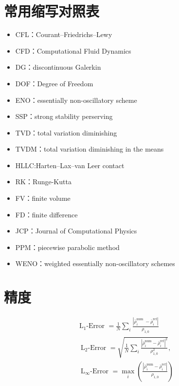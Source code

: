 \documentclass{book}
\begin{document}
\section{常用缩写对照表}
\begin{itemize}
    \item CFL：Courant–Friedrichs–Lewy
    \item CFD：Computational Fluid Dynamics
    \item DG：discontinuous Galerkin
    \item DOF：Degree of Freedom
    \item ENO：essentially non-oscillatory scheme
    \item SSP：strong stability perserving
    \item TVD：total variation diminishing
    \item TVDM：total variation diminishing in the means
    \item HLLC:Harten–Lax–van Leer contact
    \item RK：Runge-Kutta
    \item FV：finite volume
    \item FD：finite difference
    \item JCP：Journal of Computational Physics
    \item PPM：piecewise parabolic method
    \item WENO：weighted essentially non-oscillatory schemes
\end{itemize}
\section{精度}
\begin{equation}
    \begin{array}{l}
        \mathrm{L}_{1} \text {-Error }=\frac{1}{N} \sum_{i} \frac{\left|\bar{\rho}_{i}^{\text {num }}-\bar{\rho}_{i}^{\mathrm{ref}}\right|}{\rho_{1,0}} \\
        \mathrm{~L}_{2} \text {-Error }=\sqrt{\frac{1}{N} \sum_{i} \frac{\left|\bar{\rho}_{i}^{\mathrm{num}}-\bar{\rho}_{i}^{\mathrm{ref}}\right|^{2}}{\rho_{1,0}^{2}}}, \\
        \mathrm{~L}_{\infty} \text {-Error }=\max _{i}\left(\frac{\left|\bar{\rho}_{i}^{\mathrm{num}}-\bar{\rho}_{i}^{\mathrm{ref}}\right|}{\rho_{1,0}}\right)
        \end{array}
\end{equation}



\end{document}

